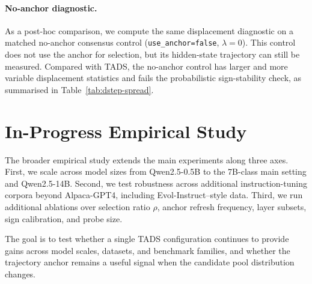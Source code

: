 \paragraph{No-anchor diagnostic.}
As a post-hoc comparison, we compute the same displacement
diagnostic on a matched no-anchor consensus control
(\texttt{use\_anchor=false}, $\lambda=0$). This control does not use
the anchor for selection, but its hidden-state trajectory can still
be measured. Compared with \textsc{TADS}, the no-anchor control has
larger and more variable displacement statistics and fails the
probabilistic sign-stability check, as summarised in
Table~\ref{tab:dstep-spread}.

\section{In-Progress Empirical Study}
\label{app:inprogress}

The broader empirical study extends the main experiments along three
axes. First, we scale across model sizes from Qwen2.5-0.5B to the
7B-class main setting and Qwen2.5-14B. Second, we test robustness
across additional instruction-tuning corpora beyond Alpaca-GPT4,
including Evol-Instruct--style data. Third, we run additional
ablations over selection ratio $\rho$, anchor refresh frequency,
layer subsets, sign calibration, and probe size.

The goal is to test whether a single \textsc{TADS} configuration
continues to provide gains across model scales, datasets, and
benchmark families, and whether the trajectory anchor remains a
useful signal when the candidate pool distribution changes.

